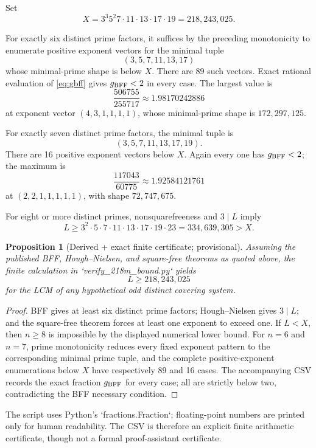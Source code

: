 \documentclass[11pt]{article}
\newtheorem{proposition}[theorem]{Proposition}
\theoremstyle{definition}
\begin{document}
Set
\begin{equation}\label{eq:X}
 X=3^3 5^2 7\cdot11\cdot13\cdot17\cdot19
  =218{,}243{,}025.
\end{equation}

For exactly six distinct prime factors, it suffices by the preceding monotonicity to enumerate
positive exponent vectors for the minimal tuple
\[
 (3,5,7,11,13,17)
\]
whose minimal-prime shape is below $X$.  There are 89 such vectors.  Exact rational evaluation
of \eqref{eq:gbff} gives $g_{\rm BFF}<2$ in every case.  The largest value is
\[
 \frac{506755}{255717}\approx1.98170242886
\]
at exponent vector $(4,3,1,1,1,1)$, whose minimal-prime shape is $172{,}297{,}125$.

For exactly seven distinct prime factors, the minimal tuple is
\[
 (3,5,7,11,13,17,19).
\]
There are 16 positive exponent vectors below $X$.  Again every one has $g_{\rm BFF}<2$; the
maximum is
\[
 \frac{117043}{60775}\approx1.92584121761
\]
at $(2,2,1,1,1,1,1)$, with shape $72{,}747{,}675$.

For eight or more distinct primes, nonsquarefreeness and $3\mid L$ imply
\[
 L\ge3^2\cdot5\cdot7\cdot11\cdot13\cdot17\cdot19\cdot23
   =334{,}639{,}305>X.
\]

\begin{proposition}[Derived + exact finite certificate; provisional]
Assuming the published BFF, Hough--Nielsen, and square-free theorems as quoted above, the finite
calculation in `verify\_218m\_bound.py` yields
\[
 \boxed{L\ge218{,}243{,}025}
\]
for the LCM of any hypothetical odd distinct covering system.
\end{proposition}

\begin{proof}
BFF gives at least six distinct prime factors; Hough--Nielsen gives $3\mid L$; and the
square-free theorem forces at least one exponent to exceed one.  If $L<X$, then $n\ge8$ is
impossible by the displayed numerical lower bound.  For $n=6$ and $n=7$, prime monotonicity
reduces every fixed exponent pattern to the corresponding minimal prime tuple, and the complete
positive-exponent enumerations below $X$ have respectively 89 and 16 cases.  The accompanying
CSV records the exact fraction $g_{\rm BFF}$ for every case; all are strictly below two,
contradicting the BFF necessary condition.
\end{proof}

The script uses Python's `fractions.Fraction`; floating-point numbers are printed only for human
readability.  The CSV is therefore an explicit finite arithmetic certificate, though not a
formal proof-assistant certificate.
\end{document}
